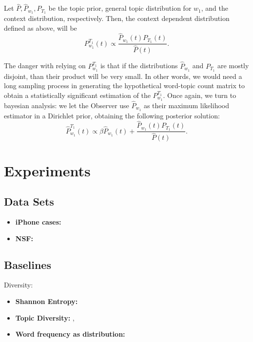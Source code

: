 \documentclass{article} %
\begin{document}
\bep
Let $\widehat{P},\widehat{P}_{w_1},P_{T_1}$ be the topic prior, general
topic distribution for $w_1$, and the context distribution,
respectively. Then, the context dependent distribution defined as
above, will be
\[P^{T_1}_{w_1}(t)\propto \frac{\widehat{P}_{w_1}\!(t)P_{T_1}\!(t)}{\widehat{P}(t)}.\]
\eep

The danger with relying on $P^{T_1}_{w_1}$
is that if the distributions $\widehat{P}_{w_1}$ and $P_{T_1}$ are
mostly disjoint, than their product will be very small. In other
words, we would need a long sampling process in generating the
hypothetical word-topic count matrix to obtain a statistically
significant estimation of the $P^{T_1}_{w_1}$. Once again,
we turn to bayesian analysis: we let the Observer use
$\widehat{P}_{w_1}$ as their maximum likelihood estimator in a
Dirichlet prior, obtaining the following posterior solution:
\[\widehat{P}^{T_1}_{w_1}(t)\propto \beta \widehat{P}_{w_1}\!(t) + \frac{\widehat{P}_{w_1}\!(t)P_{T_1}\!(t)}{\widehat{P}(t)}.\]



\section{Experiments}
\label{sec:experiments}

\subsection{Data Sets}
\label{sec:data-sets}
\begin{itemize}
\item {\bf iPhone cases:}
\item{\bf NSF:}
\end{itemize}

\subsection{Baselines}
\label{sec:baselines}

Diversity:
\begin{itemize}
\item {\bf Shannon  Entropy:}
\item{\bf Topic Diversity:} \cite{ganguly:2014}, \cite{bache:2013}
\item{\bf Word frequency as distribution:}
\end{itemize}
\end{document}
